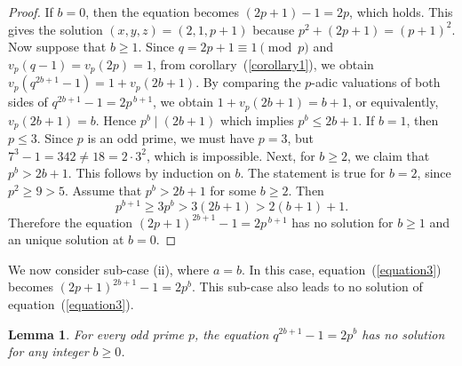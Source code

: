 \documentclass[reqno,12pt]{amsart}
\newtheorem{lemma}[theorem]{Lemma}
\theoremstyle{definition}
\begin{document}
\begin{proof}
If $b=0$, then the equation becomes $(2p+1)-1=2p$, which holds. This gives the solution $(x,y,z)=(2,1,p+1)$ because $p^2+(2p+1)=(p+1)^2$. 
Now suppose that $b\ge1$. Since $q=2p+1\equiv1\pmod p$ and $v_p(q-1)=v_p(2p)=1$, from corollary~(\ref{corollary1}), we obtain $v_p(q^{2b+1}-1)=1+v_p(2b+1).$ 
By comparing the $p$-adic valuations of both sides of $q^{2b+1}-1=2p^{\,b+1}$, we obtain $1+v_p(2b+1)=b+1$, or equivalently, $v_p(2b+1)=b$. 
Hence $p^b\mid(2b+1)$ which implies $p^b\le2b+1$. If $b=1$, then $p\le3$. 
Since $p$ is an odd prime, we must have $p=3$, but $7^3-1=342\neq18=2\cdot3^2$, which is impossible. 
Next, for $b \ge 2$,  we claim that $p^b>2b+1$. This follows by induction on $b$. The statement is true for $b=2$, since $p^2\ge9>5$. 
Assume that $p^b>2b+1$ for some $b\ge2$. Then
\begin{equation*}
    p^{b+1}\ge3p^b>3(2b+1)>2(b+1)+1.
\end{equation*}
Therefore the equation $(2p+1)^{2b+1}-1=2p^{\,b+1}$ has no solution for $b \geq 1$ and an unique solution at $b=0$.    
\end{proof}

We now consider sub-case (ii), where $a=b$. In this case, equation~(\ref{equation3}) becomes $(2p+1)^{2b+1}-1=2p^{b}$. 
This sub-case also leads to no solution of equation~(\ref{equation3}).

\begin{lemma}
\normalfont For every odd prime $p$, the equation $q^{2b+1}-1 = 2p^b$ has no solution for any integer $b\ge0$.
\end{lemma}
\end{document}
